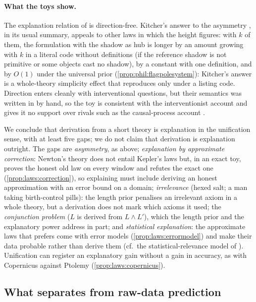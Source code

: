 \paragraph{What the toys show.}
The explanation relation of \SAIabbr is direction-free. Kitcher's answer to the asymmetry \citep{kitcher1989explanatory}, in its usual summary, appeals to other laws in which the height figures: with $k$ of them, the formulation with the shadow as hub is longer by an amount growing with $k$ in a literal code without definitions (if the reference shadow is not primitive or some objects cast no shadow), by a constant with one definition, and by $O(1)$ under the universal prior (\cref{prop:phil:flagpolesystem}): Kitcher's answer is a whole-theory simplicity effect that \SAIabbr reproduces only under a listing code. Direction enters cleanly with interventional questions, but their semantics was written in by hand, so the toy is consistent with the interventionist account \citep{woodward2003making} and gives it no support over rivals such as the causal-process account \citep{salmon1984scientific}.

We conclude that derivation from a short theory is explanation in the unification sense, with at least five gaps; we do not claim that derivation is explanation outright. The gaps are \emph{asymmetry}, as above; \emph{explanation by approximate correction}: Newton's theory does not entail Kepler's laws but, in an exact toy, proves the honest old law on every window and refutes the exact one (\cref{prop:laws:correction}), so explaining must include deriving an honest approximation with an error bound on a domain; \emph{irrelevance} (hexed salt; a man taking birth-control pills): the length prior penalises an irrelevant axiom in a whole theory, but a derivation does not mark which axioms it used; the \emph{conjunction problem} ($L$ is derived from $L\wedge L'$), which the length prior and the explanatory power address in part; and \emph{statistical explanation}: the approximate laws that \SAIabbr prefers come with error models (\cref{prop:laws:errormodel}) and make their data probable rather than derive them (cf.\ the statistical-relevance model of \citealp{salmon1971statistical}). Unification can register an explanatory gain without a gain in accuracy, as with Copernicus against Ptolemy (\cref{prop:laws:copernicus}).

\subsection{What separates \SAIabbr from raw-data prediction}\label{sec:phil:differences}

